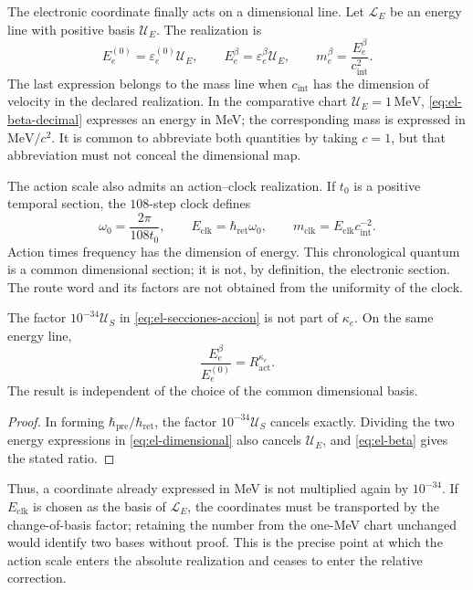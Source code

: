 The electronic coordinate finally acts on a dimensional line.
Let \(\mathcal L_E\) be an energy line with positive basis
\(\mathcal U_E\). The realization is
\begin{equation}
 E_e^{(0)}=\varepsilon_e^{(0)}\mathcal U_E,\qquad
 E_e^\beta=\varepsilon_e^\beta\mathcal U_E,
 \qquad m_e^\beta=\frac{E_e^\beta}{c_{\mathrm{int}}^2}.
 \label{eq:el-dimensional}
\end{equation}
The last expression belongs to the mass line when
\(c_{\mathrm{int}}\) has the dimension of velocity in the declared
realization. In the comparative chart \(\mathcal U_E=1\,\mathrm{MeV}\),
\eqref{eq:el-beta-decimal} expresses an energy in MeV; the corresponding
mass is expressed in \(\mathrm{MeV}/c^2\). It is common
to abbreviate both quantities by taking \(c=1\), but that abbreviation must
not conceal the dimensional map.

The action scale also admits an action--clock realization. If
\(t_0\) is a positive temporal section, the \(108\)-step clock
defines
\begin{equation}
 \omega_0=\frac{2\pi}{108t_0},\qquad
 E_{\mathrm{clk}}=\hbar_{\mathrm{ret}}\omega_0,\qquad
 m_{\mathrm{clk}}=E_{\mathrm{clk}}c_{\mathrm{int}}^{-2}.
 \label{eq:el-cuanto-reloj}
\end{equation}
Action times frequency has the dimension of energy. This chronological
quantum is a common dimensional section; it is not, by definition,
the electronic section. The route word and its factors are not
obtained from the uniformity of the clock.

\begin{proposition}
The factor \(10^{-34}\mathcal U_S\) in
\eqref{eq:el-secciones-accion} is not part of \(\kappa_e\). On
the same energy line,
\begin{equation}
 \frac{E_e^\beta}{E_e^{(0)}}=R_{\mathrm{act}}^{\kappa_e}.
 \label{eq:el-razon-energia}
\end{equation}
The result is independent of the choice of the common dimensional
basis.
\end{proposition}
\begin{proof}
In forming \(\hbar_{\mathrm{pre}}/\hbar_{\mathrm{ret}}\), the factor
\(10^{-34}\mathcal U_S\) cancels exactly. Dividing the two
energy expressions in \eqref{eq:el-dimensional} also cancels
\(\mathcal U_E\), and \eqref{eq:el-beta} gives the stated ratio.
\end{proof}

Thus, a coordinate already expressed in MeV is not multiplied again
by \(10^{-34}\). If \(E_{\mathrm{clk}}\) is chosen as the basis of
\(\mathcal L_E\), the coordinates must be transported by the
change-of-basis factor; retaining the number from the one-MeV chart
unchanged would identify two bases without proof. This is the precise point
at which the action scale enters the absolute realization and ceases to
enter the relative correction.

